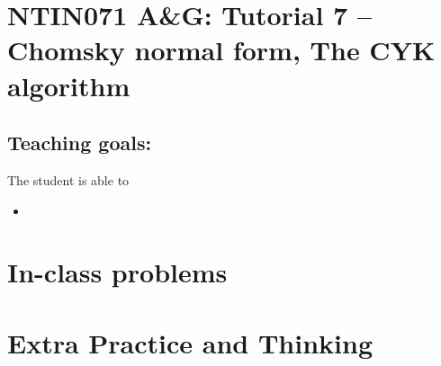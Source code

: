 \documentclass[a4paper,12pt]{amsart}
\begin{document}
\thispagestyle{empty}

\section*{NTIN071 A\&G: Tutorial 7 -- Chomsky normal form, The CYK algorithm}

\medskip

\subsection*{Teaching goals:} The student is able to

    \begin{itemize}\setlength{\itemsep}{0pt}
        \item 
    \end{itemize}


\section*{In-class problems}


\medskip\begin{problem}

\end{problem}


\section*{Extra Practice and Thinking}


\medskip\begin{problem}

\end{problem}
\end{document}
